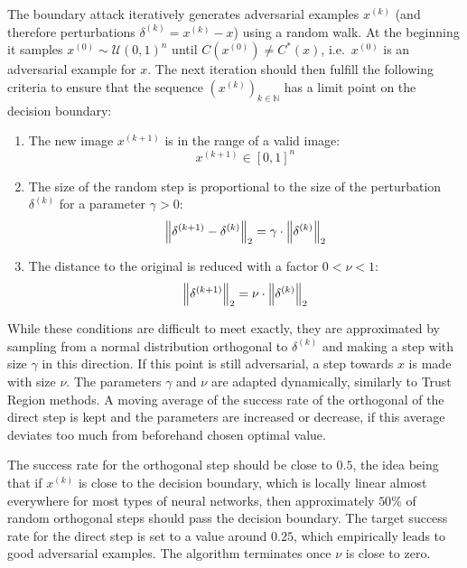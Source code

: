 The boundary attack iteratively generates adversarial examples $x^{(k)}$ (and therefore perturbations $\delta^{(k)} = x^{(k)} - x$) using a random walk. At the beginning it samples $x^{(0)} \sim \mathcal{U}(0,1)^n$ until $C(x^{(0)}) \neq C^*(x)$, i.e.\ $x^{(0)}$ is an adversarial example for $x$.
The next iteration should then fulfill the following criteria to ensure that the sequence $(x^{(k)})_{k \in \mathbb{N}}$ has a limit point on the decision boundary:

\begin{enumerate}
	\item The new image $x^{(k+1)}$ is in the range of a valid image:
	\begin{equation*}
	x^{(k+1)}\in [0,1]^n
	\end{equation*}
	
	\item The size of the random step is proportional to the size of the perturbation $\delta^{(k)}$ for a parameter $\gamma > 0$:
	\begin{equation*}
	\left \lVert \delta^{(k+1)} - \delta^{(k)} \right \rVert _{2} = \gamma \cdot \left \lVert \delta^{(k)} \right \rVert _{2}
	\end{equation*}
	
	\item The distance to the original is reduced with a factor $0<\nu<1$:
	\begin{equation*}
	\left \lVert \delta^{(k+1)} \right \rVert _{2} = \nu \cdot \left \lVert \delta^{(k)} \right \rVert _{2}
	\end{equation*}
\end{enumerate}

While these conditions are difficult to meet exactly, they are approximated by sampling from a normal distribution orthogonal to $\delta^{(k)}$ and making a step with size $\gamma$ in this direction.
If this point is still adversarial, a step towards $x$ is made with size $\nu$.
The parameters $\gamma$ and $\nu$ are adapted dynamically, similarly to Trust Region methods.
A moving average of the success rate of the orthogonal of the direct step is kept and the parameters are increased or decrease, if this average deviates too much from beforehand chosen optimal value.

The success rate for the orthogonal step should be close to $0.5$, the idea being that if $x^{(k)}$ is close to the decision boundary, which is locally linear almost everywhere for most types of neural networks, then approximately $50\%$ of random orthogonal steps should pass the decision boundary. 
The target success rate for the direct step is set to a value around $0.25$, which empirically leads to good adversarial examples.
The algorithm terminates once $\nu$ is close to zero.


